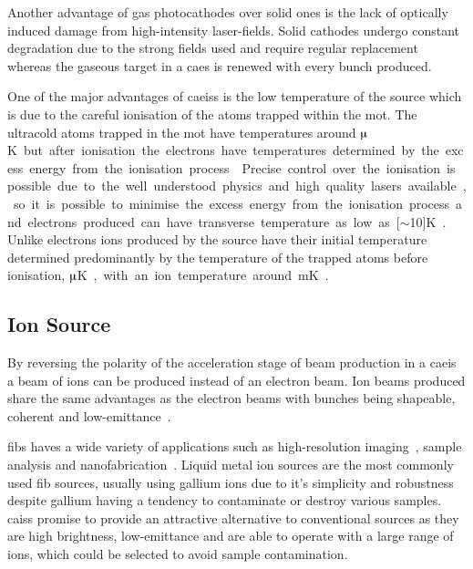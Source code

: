 Another advantage of gas photocathodes over solid ones is the lack of optically induced damage from high-intensity laser-fields.
Solid cathodes undergo constant degradation due to the strong fields used and require regular replacement~\cite{dowell_results_1995} whereas the gaseous target in a \gls{caes} is renewed with every bunch produced.

One of the major advantages of \glspl{caeis} is the low temperature of the source which is due to the careful ionisation of the atoms trapped within the \gls{mot}.
The ultracold atoms trapped in the \gls{mot} have temperatures around \unit[100]{$\muup$K} but after ionisation the electrons have temperatures determined by the excess energy from the ionisation process~\cite{engelen_high-coherence_2013,engelen_analytical_2014,sparkes_high-coherence_2014,speirs_identification_2017}.
Precise control over the ionisation is possible due to the well understood physics and high quality lasers available, so it is possible to minimise the excess energy from the ionisation process and electrons produced can have transverse temperature as low as \unit[$\sim$10]{K}~\cite{saliba_spatial_2012}.
Unlike electrons ions produced by the source have their initial temperature determined predominantly by the temperature of the trapped atoms before ionisation, \unit[100]{$\muup$K}, with an ion temperature around \unit[1]{mK}~\cite{debernardi_measurement_2011,murphy_detailed_2014}.

\subsection{Ion Source}

By reversing the polarity of the acceleration stage of beam production in a \gls{caeis} a beam of ions can be produced instead of an electron beam.
Ion beams produced share the same advantages as the electron beams with bunches being shapeable, coherent and low-emittance~\cite{knuffman_cold_2013}.

\Glspl{fib} haves a wide variety of applications such as high-resolution imaging~\cite{scipioni_helium_2008}, sample analysis and nanofabrication~\cite{khizroev_focused-ion-beam-based_2004}.
Liquid metal ion sources are the most commonly used \gls{fib} sources, usually using gallium ions due to it's simplicity and robustness despite gallium having a tendency to contaminate or destroy various samples.
\Glspl{cais} promise to provide an attractive alternative to conventional sources as they are high brightness, low-emittance and are able to operate with a large range of ions, which could be selected to avoid sample contamination.

